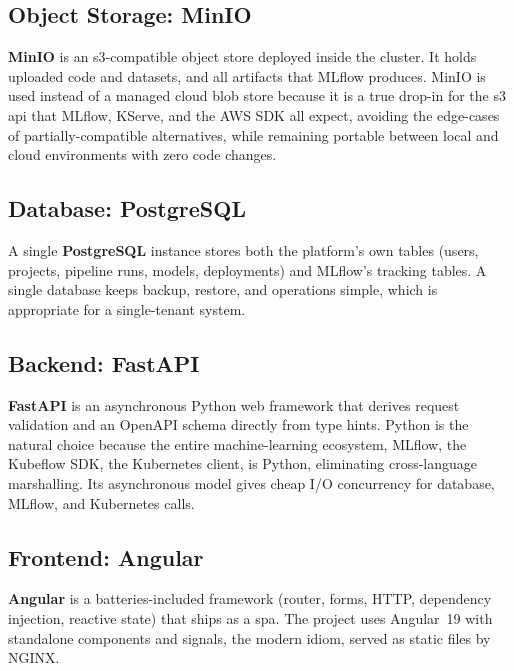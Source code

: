 
\subsection{Object Storage: MinIO}
\textbf{MinIO} is an \gls{s3}-compatible object store deployed inside the cluster.
It holds uploaded code and datasets, and all artifacts that MLflow produces.
MinIO is used instead of a managed cloud blob store because it is a true drop-in
for the \gls{s3} \gls{api} that MLflow, KServe, and the AWS SDK all expect,
avoiding the edge-cases of partially-compatible alternatives, while remaining
portable between local and cloud environments with zero code changes.


\subsection{Database: PostgreSQL}
A single \textbf{PostgreSQL} instance stores both the platform's own tables
(users, projects, pipeline runs, models, deployments) and MLflow's tracking tables.
A single database keeps backup, restore, and operations simple, which is
appropriate for a single-tenant system.


\subsection{Backend: FastAPI}
\textbf{FastAPI} is an asynchronous Python web framework that derives request
validation and an OpenAPI schema directly from type hints. Python is the natural
choice because the entire machine-learning ecosystem, MLflow, the Kubeflow SDK,
the Kubernetes client, is Python, eliminating cross-language marshalling. Its
asynchronous model gives cheap I/O concurrency for database, MLflow, and Kubernetes
calls.


\subsection{Frontend: Angular}
\textbf{Angular} is a batteries-included framework (router, forms, HTTP, dependency
injection, reactive state) that ships as a \gls{spa}. The project uses Angular~19
with standalone components and signals, the modern idiom, served as static
files by NGINX.

